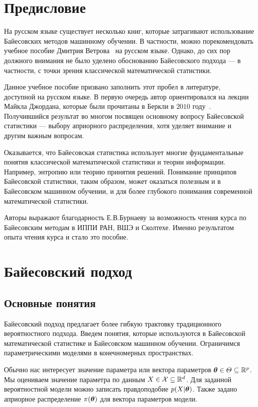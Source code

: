 \section{Предисловие}

На русском языке существует несколько книг, 
которые затрагивают использование Байесовских методов машинному обучении.
В частности, можно порекомендовать учебное пособие Дмитрия Ветрова~\cite{vetrov2007bayesian} на русском языке.
Однако, до сих пор должного внимания не было уделено обоснованию Байесовского подхода --- в частности, 
с точки зрения классической математической статистики.

Данное учебное пособие призвано заполнить этот пробел в 
литературе, доступной на русском языке.
В первую очередь автор ориентировался на лекции Майкла Джордана, 
которые были прочитаны в Беркли в $2010$ году~\cite{jordan10notes}.
Получившийся результат во многом посвящен основному вопросу Байесовской статистики --- выбору априорного распределения,
хотя уделяет внимание и другим важным вопросам.

Оказывается, что Байесовская статистика использует 
многие фундаментальные понятия классической математической статистики и теории информации. 
Например, энтропию или теорию принятия решений.
Понимание принципов Байесовской статистики, таким образом, может оказаться полезным и в Байесовском машинном обучении, и для более глубокого понимания
современной математической статистики.

Авторы выражают благодарность Е.В.Бурнаеву за возможность чтения курса по Байесовским методам в ИППИ РАН, ВШЭ и Сколтехе.
Именно результатом опыта чтения курса и стало это пособие.

\section{Байесовский подход}

\subsection{Основные понятия}
Байесовский подход предлагает более гибкую трактовку традиционного вероятностного подхода.
Введем понятия, которые используются в Байесовской математической статистике и Байесовском машинном обучении.
Ограничимся параметрическими моделями в конечномерных пространствах.

Обычно нас интересует значение параметра или вектора параметров
$\boldsymbol{\theta} \in \varTheta \subseteq \mathbb{R}^p$.
Мы оцениваем значение параметра по данным $X \in \mathcal{X} \subseteq \mathbb{R}^d$.
Для заданной вероятностной модели можно записать правдоподобие 
$p(X | \boldsymbol{\theta})$.
Также задано априорное распределение $\pi(\boldsymbol{\theta})$ для вектора параметров модели.

